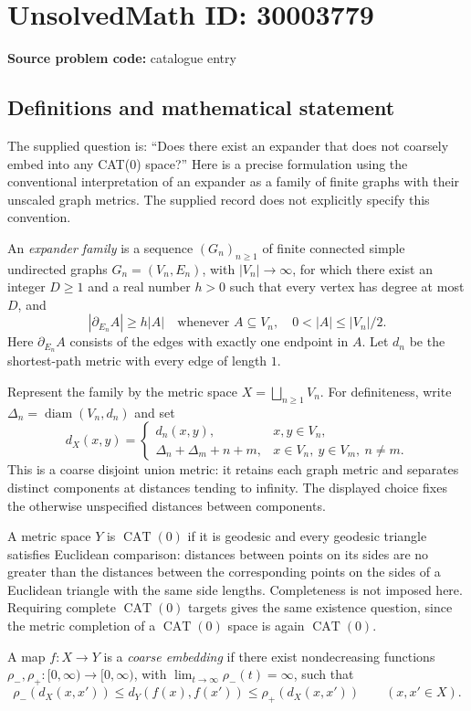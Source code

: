 \documentclass[11pt]{article}
\begin{document}
\section*{UnsolvedMath ID: 30003779}
\textbf{Source problem code:} catalogue entry
\subsection{Definitions and mathematical statement}
The supplied question is: ``Does there exist an expander that does not coarsely embed into any CAT(0) space?'' Here is a precise formulation using the conventional interpretation of an expander as a family of finite graphs with their unscaled graph metrics. The supplied record does not explicitly specify this convention.

An \emph{expander family} is a sequence \((G_n)_{n\geq 1}\) of finite connected simple undirected graphs \(G_n=(V_n,E_n)\), with \(|V_n|\to\infty\), for which there exist an integer \(D\geq 1\) and a real number \(h>0\) such that every vertex has degree at most \(D\), and
\[
 |\partial_{E_n}A|\geq h|A|
 \quad\text{whenever }A\subseteq V_n,\quad 0<|A|\leq |V_n|/2.
\]
Here \(\partial_{E_n}A\) consists of the edges with exactly one endpoint in \(A\). Let \(d_n\) be the shortest-path metric with every edge of length \(1\).

Represent the family by the metric space \(X=\bigsqcup_{n\geq1}V_n\). For definiteness, write \(\Delta_n=\operatorname{diam}(V_n,d_n)\) and set
\[
 d_X(x,y)=
 \begin{cases}
 d_n(x,y),&x,y\in V_n,\\
 \Delta_n+\Delta_m+n+m,&x\in V_n,\ y\in V_m,\ n\neq m.
 \end{cases}
\]
This is a coarse disjoint union metric: it retains each graph metric and separates distinct components at distances tending to infinity. The displayed choice fixes the otherwise unspecified distances between components.

A metric space \(Y\) is \(\operatorname{CAT}(0)\) if it is geodesic and every geodesic triangle satisfies Euclidean comparison: distances between points on its sides are no greater than the distances between the corresponding points on the sides of a Euclidean triangle with the same side lengths. Completeness is not imposed here. Requiring complete \(\operatorname{CAT}(0)\) targets gives the same existence question, since the metric completion of a \(\operatorname{CAT}(0)\) space is again \(\operatorname{CAT}(0)\).

A map \(f:X\to Y\) is a \emph{coarse embedding} if there exist nondecreasing functions \(\rho_-,\rho_+:[0,\infty)\to[0,\infty)\), with \(\lim_{t\to\infty}\rho_-(t)=\infty\), such that
\[
 \rho_-(d_X(x,x'))\leq d_Y(f(x),f(x'))\leq\rho_+(d_X(x,x'))
 \qquad(x,x'\in X).
\]
\end{document}
